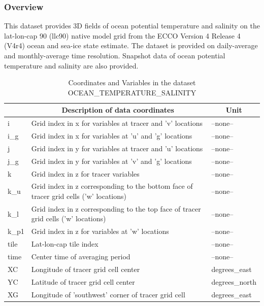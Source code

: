 \subsubsection{Overview}
This dataset provides 3D fields of ocean potential temperature and salinity on the lat-lon-cap 90 (llc90) native model grid from the ECCO Version 4 Release 4 (V4r4) ocean and sea-ice state estimate. The dataset is provided on daily-average and monthly-average time resolution. Snapshot data of ocean potential temperature and salinity are also provided. 
\begin{longtable}{|m{}|m{}|m{}|}
\caption{Coordinates and Variables in the dataset OCEAN\_TEMPERATURE\_SALINITY}
\label{tab:table-OCEAN_TEMPERATURE_SALINITY-fields} \\ 
\hline \endhead \hline \endfoot
\rowcolor{lightgray} \multicolumn{1}{|c|}{\textbf{Coordinates}} & \multicolumn{1}{|c|}{\textbf{Description of data coordinates}} &  \multicolumn{1}{|c|}{\textbf{Unit}}\\ \hline
i &Grid index in x for variables at tracer and 'v' locations &--none--  \\ \hline
i\_g &Grid index in x for variables at 'u' and 'g' locations &--none--  \\ \hline
j &Grid index in y for variables at tracer and 'u' locations &--none--  \\ \hline
j\_g &Grid index in y for variables at 'v' and 'g' locations &--none--  \\ \hline
k &Grid index in z for tracer variables &--none--  \\ \hline
k\_u &Grid index in z corresponding to the bottom face of tracer grid cells ('w' locations) &--none--  \\ \hline
k\_l &Grid index in z corresponding to the top face of tracer grid cells ('w' locations) &--none--  \\ \hline
k\_p1 &Grid index in z for variables at 'w' locations &--none--  \\ \hline
tile &Lat-lon-cap tile index &--none--  \\ \hline
time &Center time of averaging period &--none--  \\ \hline
XC &Longitude of tracer grid cell center &degrees\_east  \\ \hline
YC &Latitude of tracer grid cell center &degrees\_north  \\ \hline
XG &Longitude of 'southwest' corner of tracer grid cell &degrees\_east  \\ \hline

\end{longtable}
